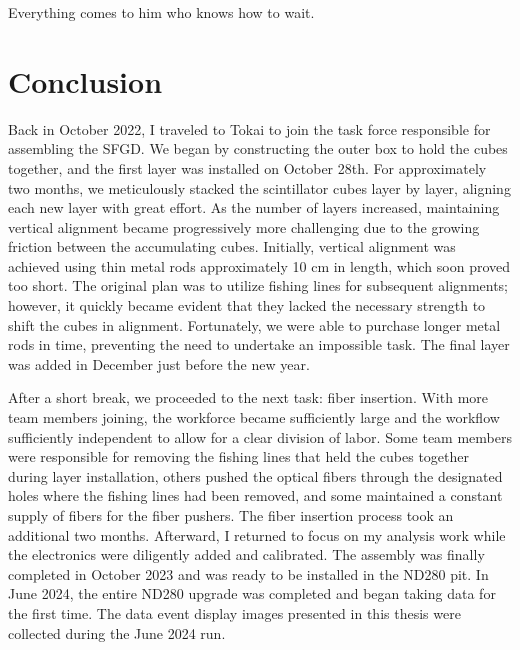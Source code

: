 \begin{savequote}[8cm]
Everything comes to him who knows how to wait.

\end{savequote}

\chapter{\label{ch:1-concl}Conclusion} 

\minitoc

Back in October 2022, I traveled to Tokai to join the task force responsible for assembling the SFGD.
We began by constructing the outer box to hold the cubes together, and the first layer was installed on October 28th.
For approximately two months, we meticulously stacked the scintillator cubes layer by layer, aligning each new layer with great effort.
As the number of layers increased, maintaining vertical alignment became progressively more challenging due to the growing friction between the accumulating cubes.
Initially, vertical alignment was achieved using thin metal rods approximately 10 cm in length, which soon proved too short.
The original plan was to utilize fishing lines for subsequent alignments; however, it quickly became evident that they lacked the necessary strength to shift the cubes in alignment.
Fortunately, we were able to purchase longer metal rods in time, preventing the need to undertake an impossible task.
The final layer was added in December just before the new year.

After a short break, we proceeded to the next task: fiber insertion.
With more team members joining, the workforce became sufficiently large and the workflow sufficiently independent to allow for a clear division of labor.
Some team members were responsible for removing the fishing lines that held the cubes together during layer installation, others pushed the optical fibers through the designated holes where the fishing lines had been removed, and some maintained a constant supply of fibers for the fiber pushers.
The fiber insertion process took an additional two months.
Afterward, I returned to focus on my analysis work while the electronics were diligently added and calibrated.
The assembly was finally completed in October 2023 and was ready to be installed in the ND280 pit.
In June 2024, the entire ND280 upgrade was completed and began taking data for the first time.
The data event display images presented in this thesis were collected during the June 2024 run.

